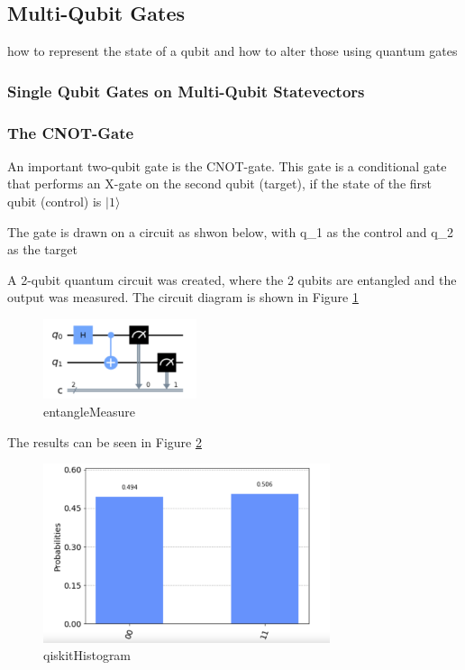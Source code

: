 \subsection{Multi-Qubit Gates}

how to represent the state of a qubit and how to alter those using quantum gates

\subsubsection{Single Qubit Gates on Multi-Qubit Statevectors}

\subsubsection{The CNOT-Gate}
An important two-qubit gate is the CNOT-gate. This gate is a conditional gate that performs an X-gate on the second qubit (target), if the state of the first qubit (control) is  $|1\rangle$

The gate is drawn on a circuit as shwon below, with q\_1 as the control and q\_2 as the target

A 2-qubit quantum circuit was created, where the 2 qubits are entangled and the output was measured. The circuit diagram is shown in Figure \ref{fig:entangleMeasure}

\begin{figure}[h]
    \centering
    \includegraphics[width=0.4\textwidth]{lab2/images/entangleMeasure.png}
    \caption{entangleMeasure} 
    \label{fig:entangleMeasure}
\end{figure}

The results can be seen in Figure \ref{fig:qiskitHistogram}

\begin{figure}[h]
    \centering
    \includegraphics[width=0.75\textwidth]{lab2/images/qiskitHistogram.png}
    \caption{qiskitHistogram} 
    \label{fig:qiskitHistogram}
\end{figure} 

